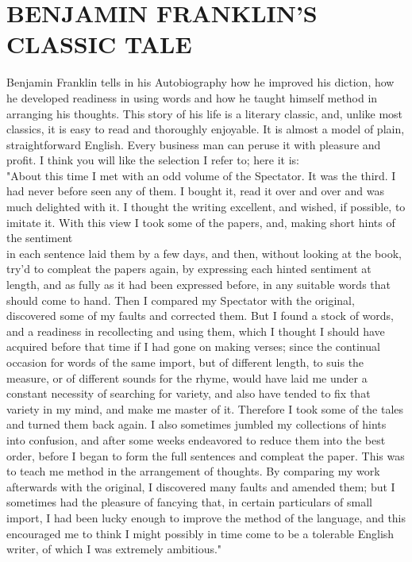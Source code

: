 \documentclass[10pt]{article}
\begin{document}
\section*{BENJAMIN FRANKLIN'S CLASSIC TALE}
Benjamin Franklin tells in his Autobiography how he improved his diction, how he developed readiness in using words and how he taught himself method in arranging his thoughts. This story of his life is a literary classic, and, unlike most classics, it is easy to read and thoroughly enjoyable. It is almost a model of plain, straightforward English. Every business man can peruse it with pleasure and profit. I think you will like the selection I refer to; here it is:\\
"About this time I met with an odd volume of the Spectator. It was the third. I had never before seen any of them. I bought it, read it over and over and was much delighted with it. I thought the writing excellent, and wished, if possible, to imitate it. With this view I took some of the papers, and, making short hints of the sentiment\\
in each sentence laid them by a few days, and then, without looking at the book, try'd to compleat the papers again, by expressing each hinted sentiment at length, and as fully as it had been expressed before, in any suitable words that should come to hand. Then I compared my Spectator with the original, discovered some of my faults and corrected them. But I found a stock of words, and a readiness in recollecting and using them, which I thought I should have acquired before that time if I had gone on making verses; since the continual occasion for words of the same import, but of different length, to suis the measure, or of different sounds for the rhyme, would have laid me under a constant necessity of searching for variety, and also have tended to fix that variety in my mind, and make me master of it. Therefore I took some of the tales and turned them back again. I also sometimes jumbled my collections of hints into confusion, and after some weeks endeavored to reduce them into the best order, before I began to form the full sentences and compleat the paper. This was to teach me method in the arrangement of thoughts. By comparing my work afterwards with the original, I discovered many faults and amended them; but I sometimes had the pleasure of fancying that, in certain particulars of small import, I had been lucky enough to improve the method of the language, and this encouraged me to think I might possibly in time come to be a tolerable English writer, of which I was extremely ambitious."
\end{document}
